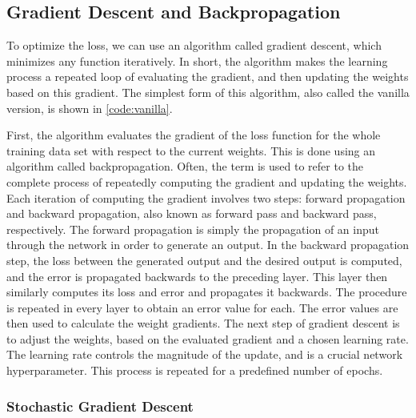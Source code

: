 \subsection{Gradient Descent and Backpropagation} \label{sec:backprop}

\noindent To optimize the loss, we can use an algorithm called gradient descent, which minimizes any function iteratively. In short, the algorithm makes the learning process a repeated loop of evaluating the gradient, and then updating the weights based on this gradient. The simplest form of this algorithm, also called the vanilla version, is shown in \autoref{code:vanilla}. \\



\noindent First, the algorithm evaluates the gradient of the loss function for the whole training data set with respect to the current weights. This is done using an algorithm called backpropagation. Often, the term is used to refer to the complete process of repeatedly computing the gradient and updating the weights. Each iteration of computing the gradient involves two steps: forward propagation and backward propagation, also known as forward pass and backward pass, respectively. The forward propagation is simply the propagation of an input through the network in order to generate an output. In the backward propagation step, the loss between the generated output and the desired output is computed, and the error is propagated backwards to the preceding layer. This layer then similarly computes its loss and error and propagates it backwards. The procedure is repeated in every layer to obtain an error value for each. The error values are then used to calculate the weight gradients. The next step of gradient descent is to adjust the weights, based on the evaluated gradient and a chosen learning rate. The learning rate controls the magnitude of the update, and is a crucial network hyperparameter. This process is repeated for a predefined number of epochs.

\subsubsection{Stochastic Gradient Descent}

